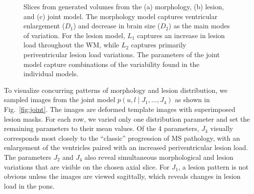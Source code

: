 \begin{figure}[tb]
{
} \caption{Slices from generated volumes from the (a) morphology, (b) lesion,
and (c) joint model. The morphology model captures ventricular
enlargement ($D_1$) and decrease in brain size ($D_2$) as the main modes of
variation. For the lesion model, $L_1$ captures an increase in lesion load
throughout the WM, while $L_2$ captures primarily periventricular lesion load
variations. The parameters of the joint model capture combinations
of the variability found in the individual models.}
\label{fig:samples}
\end{figure}

To visualize concurring patterns of morphology and lesion distribution, we
sampled images from the joint model $p(u, l \mid J_1, \dotsc, J_4)$ as shown in
Fig.~\ref{fig:joint}. The images are deformed template images with superimposed
lesion masks. For each row, we varied only one distribution parameter and set
the remaining parameters to their mean values. Of the 4 parameters, $J_3$
visually corresponds most closely to the ``classic'' progression of MS
pathology, with an enlargement of the ventricles paired with an increased
periventricular lesion load. The parameters $J_2$ and $J_4$ also reveal
simultaneous morphological and lesion variations that are visible on the chosen
axial slice. For $J_1$, a lesion pattern is not obvious unless the images are
viewed sagittally, which reveals changes in lesion load in the pons.

